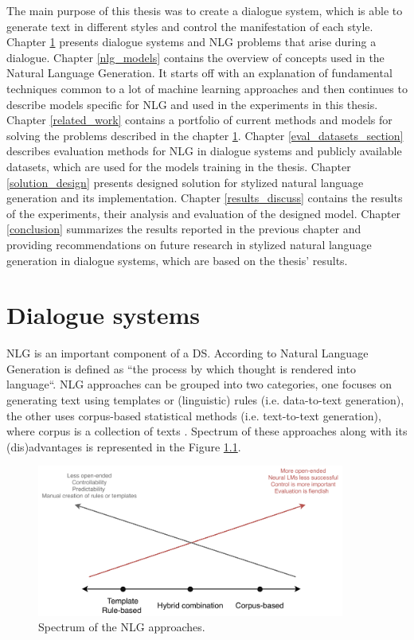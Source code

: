 The main purpose of this thesis was to create a dialogue system, which is able to generate text in different styles and control the manifestation of each style. Chapter \ref{ds_problems} presents dialogue systems and NLG problems that arise during a dialogue. Chapter \ref{nlg_models} contains the overview of concepts used in the Natural Language Generation. It starts off with an explanation of fundamental techniques common to a lot of machine learning approaches and then continues to describe models specific for NLG and used in the experiments in this thesis. Chapter \ref{related_work} contains a portfolio of current methods and models for solving the problems described in the chapter \ref{ds_problems}. Chapter \ref{eval_datasets_section} describes evaluation methods for NLG in dialogue systems and  publicly available datasets, which are used for the models training in the thesis. Chapter \ref{solution_design} presents designed solution for stylized natural language generation and its implementation. Chapter \ref{results_discuss} contains the results of the experiments, their analysis and evaluation of the designed model. Chapter \ref{conclusion} summarizes the results reported in the previous chapter and providing recommendations on future research in stylized natural language generation in dialogue systems, which are based on the thesis' results. 

\chapter{Dialogue systems}\label{ds_problems}
NLG is an important component of a DS. According to \cite{alder2017handbook} Natural Language Generation is defined as ``the process by which thought is rendered into language``. NLG approaches can be grouped into two categories, one focuses on generating text using templates or (linguistic) rules (i.e. data-to-text generation), the other uses corpus-based statistical methods (i.e. text-to-text generation), where corpus is a collection of texts \cite{oh2002stochastic}. Spectrum of these approaches along with its (dis)advantages is represented in the Figure \ref{nlg_spectum}.


\begin{figure}[hbt]
  \centering
  \includegraphics[width=0.9\textwidth]{figures/templateVScorpus.pdf}
  \caption{Spectrum of the NLG approaches.}
  \label{nlg_spectum}
\end{figure}

